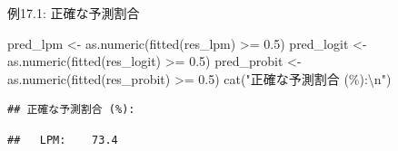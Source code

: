 \documentclass[
  ignorenonframetext,
]{beamer}
\newenvironment{Shaded}{\begin{snugshade}}{\end{snugshade}}
\newcommand{\DecValTok}[1]{\textcolor[rgb]{0.00,0.00,0.81}{#1}}
\newcommand{\FloatTok}[1]{\textcolor[rgb]{0.00,0.00,0.81}{#1}}
\newcommand{\FunctionTok}[1]{\textcolor[rgb]{0.00,0.00,0.00}{#1}}
\newcommand{\NormalTok}[1]{#1}
\newcommand{\OtherTok}[1]{\textcolor[rgb]{0.56,0.35,0.01}{#1}}
\newcommand{\SpecialCharTok}[1]{\textcolor[rgb]{0.00,0.00,0.00}{#1}}
\newcommand{\StringTok}[1]{\textcolor[rgb]{0.31,0.60,0.02}{#1}}
\begin{document}
\begin{frame}[fragile]{例17.1: 正確な予測割合}
\protect\hypertarget{ux4f8b17.1-ux6b63ux78baux306aux4e88ux6e2cux5272ux5408}{}
\footnotesize

\begin{Shaded}
\begin{Highlighting}[]
\NormalTok{pred\_lpm    }\OtherTok{\textless{}{-}} \FunctionTok{as.numeric}\NormalTok{(}\FunctionTok{fitted}\NormalTok{(res\_lpm)    }\SpecialCharTok{\textgreater{}=} \FloatTok{0.5}\NormalTok{)}
\NormalTok{pred\_logit  }\OtherTok{\textless{}{-}} \FunctionTok{as.numeric}\NormalTok{(}\FunctionTok{fitted}\NormalTok{(res\_logit)  }\SpecialCharTok{\textgreater{}=} \FloatTok{0.5}\NormalTok{)}
\NormalTok{pred\_probit }\OtherTok{\textless{}{-}} \FunctionTok{as.numeric}\NormalTok{(}\FunctionTok{fitted}\NormalTok{(res\_probit) }\SpecialCharTok{\textgreater{}=} \FloatTok{0.5}\NormalTok{)}
\FunctionTok{cat}\NormalTok{(}\StringTok{"正確な予測割合 (\%):}\SpecialCharTok{\textbackslash{}n}\StringTok{"}\NormalTok{)}
\end{Highlighting}
\end{Shaded}

\begin{verbatim}
## 正確な予測割合 (%):
\end{verbatim}

\begin{Shaded}
\end{Shaded}

\begin{verbatim}
##   LPM:    73.4
\end{verbatim}

\begin{Shaded}
\end{Shaded}


\end{frame}
\end{document}
